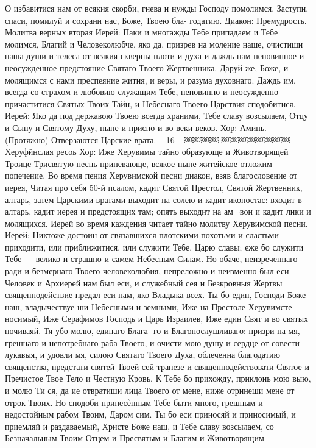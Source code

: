 О избавитися нам от всякия скорби, гнева и нужды Господу помолимся.
Заступи, спаси, помилуй и сохрани нас, Боже, Твоею бла- годатию.
Диакон: Премудрость.
Молитва верных вторая
Иерей: Паки и многажды Тебе припадаем и Тебе молимся, Благий и Человеколюбче, яко да, призрев на моление наше, очистиши наша души и телеса от всякия скверны плоти и духа и даждь нам неповинное и неосужденное предстояние Святаго Твоего Жертвенника. Даруй же, Боже, и молящимся с нами преспеяние жития, и веры, и разума духовнаго. Даждь им, всегда со страхом и любовию служащим Тебе, неповинно и неосужденно причаститися Святых Твоих Тайн, и Небеснаго Твоего Царствия сподобитися.
Иерей: Яко да под державою Твоею всегда храними, Тебе славу возсылаем, Отцу и Сыну и Святому Духу, ныне и присно и во веки веков.
Хор: Аминь. (Протяжно)
Отверзаются Царские врата.
~ 16 ~
￼￼￼￼
￼￼￼￼￼￼￼￼Херуфйнслая ресоь
Хор: Иже Херувимы тайно образующе и Животворящей
Троице Трисвятую песнь припевающе, всякое ныне житейское
отложим попечение.
Во время пения Херувимской песни диакон, взяв благословение от иерея, Читая про себя 50-й псалом, кадит Святой
Престол, Святой Жертвенник, алтарь, затем Царскими вратами выходит на солею и кадит иконостас: входит в алтарь, кадит иерея и предстоящих там; опять выходит на ам¬вон и кадит лики и молящихся. Иерей во время каждения читает тайно молитву Херувимской песни.
Иерей: Никтоже достоин от связавшихся плотскими похотьми и сластьми приходити, или приближитися, или служити Тебе, Царю славы; еже бо служити Тебе — велико и страшно и самем Небесным Силам. Но обаче, неизреченнаго ради и безмернаго Твоего человеколюбия, непреложно и неизменно был еси Человек и Архиерей нам был еси, и служебный сея и Безкровныя Жертвы священнодействие предал еси нам, яко Владыка всех. Ты бо един, Господи Боже наш, владычествуе-ши Небесными и земными, Иже на Престоле Херувимсте носимый, Иже Серафимов Господь и Царь Израилев, Иже един Свят и во святых почиваяй. Тя убо молю, единаго Блага- го и Благопослушливаго: призри на мя, грешнаго и непотребнаго раба Твоего, и очисти мою душу и сердце от совести лукавыя, и удовли мя, силою Святаго Твоего Духа, облеченна благодатию священства, предстати святей Твоей сей трапезе и священнодействовати Святое и Пречистое Твое Тело и Честную Кровь. К Тебе бо прихожду, приклонь мою выю, и молю Ти ся, да ие отвратиши лица Твоего от мене, ниже отринеши мене от отрок Твоих. Но сподоби принесѐнным Тебе быти много, грешным и недостойным рабом Твоим, Даром сим. Ты бо еси приносяй и приносимый, и приемляй и раздаваемый, Христе Боже наш, и Тебе славу возсылаем, со Безначальным Твоим Отцем и Пресвятым и Благим и Животворящим
